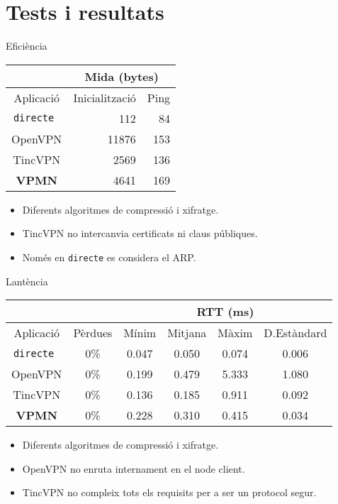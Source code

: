 \section{Tests i resultats}
    \begin{frame}{Eficiència}
        \begin{center}
\begin{tabular}{|c|r|r|}
\multicolumn{1}{c}{} & \multicolumn{2}{|c|}{Mida (bytes)} \\ \hline
Aplicació & Inicialització & Ping \\ \hline \hline
\tt directe & 112 & 84 \\ \hline
OpenVPN & 11876 & 153 \\ \hline
TincVPN & 2569 & 136 \\ \hline
\bf VPMN & 4641 & 169 \\ \hline
\end{tabular}
        \end{center}
        \begin{itemize}
\item Diferents algoritmes de compressió i xifratge.
\item TincVPN no intercanvia certificats ni claus públiques.
\item Només en {\tt directe} es considera el ARP.
        \end{itemize}
    \end{frame}
    \begin{frame}{Lantència}
        \begin{center}
\begin{tabular}{|c|c|c|c|c|c|}
\multicolumn{2}{c}{} & \multicolumn{4}{|c|}{RTT (ms)} \\ \hline
Aplicació & Pèrdues & Mínim & Mitjana & Màxim & D.Estàndard \\ \hline \hline
\tt directe & 0\% & 0.047 & 0.050 & 0.074 & 0.006 \\ \hline
OpenVPN & 0\% & 0.199 & 0.479 & 5.333 & 1.080 \\ \hline
TincVPN & 0\% & 0.136 & 0.185 & 0.911 & 0.092 \\ \hline
\bf VPMN & 0\% & 0.228 & 0.310 & 0.415 & 0.034 \\ \hline
\end{tabular}
        \end{center}
        \begin{itemize}
\item Diferents algoritmes de compressió i xifratge.
\item OpenVPN no enruta internament en el node client.
\item TincVPN no compleix tots els requisits per a ser un protocol segur.
        \end{itemize}
    \end{frame}
